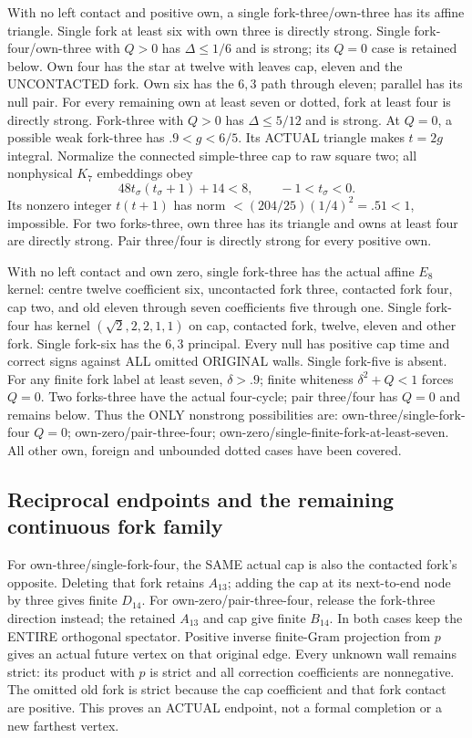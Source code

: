 With no left contact and positive own, a single
fork-three/own-three has its affine triangle.
Single fork at least six with own three is directly
strong.
Single fork-four/own-three with \(Q>0\) has
\(\Delta\le1/6\) and is strong; its \(Q=0\)
case is retained below.
Own four has the star at twelve with leaves cap,
eleven and the UNCONTACTED fork.
Own six has the \(6,3\) path through eleven;
parallel has its null pair.
For every remaining own at least seven or dotted,
fork at least four is directly strong.
Fork-three with \(Q>0\) has \(\Delta\le5/12\)
and is strong.
At \(Q=0\), a possible weak fork-three has
\(.9<g<6/5\).
Its ACTUAL triangle makes \(t=2g\) integral.
Normalize the connected simple-three cap to raw
square two; all nonphysical \(K_7\) embeddings obey
\[
                  48t_\sigma(t_\sigma+1)+14<8,
                  \qquad -1<t_\sigma<0 .
\]
Its nonzero integer \(t(t+1)\) has norm
\(<(204/25)(1/4)^2=.51<1\), impossible.
For two forks-three, own three has its triangle
and owns at least four are directly strong.
Pair three/four is directly strong for every
positive own.

With no left contact and own zero, single
fork-three has the actual affine \(E_8\) kernel:
centre twelve coefficient six, uncontacted fork
three, contacted fork four, cap two, and old
eleven through seven coefficients five through one.
Single fork-four has kernel
\((\sqrt2,2,2,1,1)\) on
cap, contacted fork, twelve, eleven and other fork.
Single fork-six has the \(6,3\) principal.
Every null has positive cap time and correct signs
against ALL omitted ORIGINAL walls.
Single fork-five is absent.
For any finite fork label at least seven,
\(\delta>.9\); finite whiteness
\(\delta^2+Q<1\) forces \(Q=0\).
Two forks-three have the actual four-cycle;
pair three/four has \(Q=0\) and remains below.
Thus the ONLY nonstrong possibilities are:
own-three/single-fork-four \(Q=0\);
own-zero/pair-three-four;
own-zero/single-finite-fork-at-least-seven.
All other own, foreign and unbounded dotted cases
have been covered.

\subsection{Reciprocal endpoints and the remaining continuous fork family}
\label{app:arithD14typedexceptions}

For own-three/single-fork-four, the SAME actual cap
is also the contacted fork's opposite.
Deleting that fork retains \(A_{13}\); adding the
cap at its next-to-end node by three gives finite \(D_{14}\).
For own-zero/pair-three-four, release the fork-three
direction instead; the retained \(A_{13}\) and cap
give finite \(B_{14}\).
In both cases keep the ENTIRE orthogonal spectator.
Positive inverse finite-Gram projection from \(p\)
gives an actual future vertex on that original edge.
Every unknown wall remains strict: its product with
\(p\) is strict and all correction coefficients
are nonnegative.
The omitted old fork is strict because the cap
coefficient and that fork contact are positive.
This proves an ACTUAL endpoint, not a formal
completion or a new farthest vertex.

